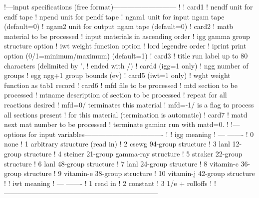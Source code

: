 \small
\begin{ccode}

   !---input specifications (free format)---------------------------
   !
   ! card1
   !    nendf   unit for endf tape
   !    npend   unit for pendf tape
   !    ngam1   unit for input ngam tape (default=0)
   !    ngam2   unit for output ngam tape (default=0)
   ! card2
   !    matb    material to be processed
   !            input materials in ascending order
   !    igg     gamma group structure option
   !    iwt     weight function option
   !    lord    legendre order
   !    iprint  print option (0/1=minimum/maximum) (default=1)
   ! card3
   !    title   run label up to 80 characters (delimited by ',
   !            ended with /)
   ! card4      (igg=1 only)
   !    ngg     number of groups
   !    egg     ngg+1 group bounds (ev)
   ! card5      (iwt=1 only)
   !    wght    weight function as tab1 record
   ! card6
   !    mfd     file to be processed
   !    mtd     section to be processed
   !    mtname  description of section to be processed
   !            repeat for all reactions desired
   !            mfd=0/ terminates this material
   !            mfd=-1/ is a flag to process all sections present
   !            for this material  (termination is automatic)
   ! card7
   !    matd    next mat number to be processed
   !            terminate gaminr run with matd=0.
   !
   !---options for input variables----------------------------------
   !
   !        igg     meaning
   !        ---     -------
   !         0      none
   !         1      arbitrary structure (read in)
   !         2      csewg 94-group structure
   !         3      lanl 12-group structure
   !         4      steiner 21-group gamma-ray structure
   !         5      straker 22-group structure
   !         6      lanl 48-group structure
   !         7      lanl 24-group structure
   !         8      vitamin-c 36-group structure
   !         9      vitamin-e 38-group structure
   !         10      vitamin-j 42-group structure
   !
   !        iwt     meaning
   !        ---     -------
   !         1      read in
   !         2      constant
   !         3      1/e + rolloffs
   !
   !------------------------------------------------------------------

\end{ccode}
\normalsize

